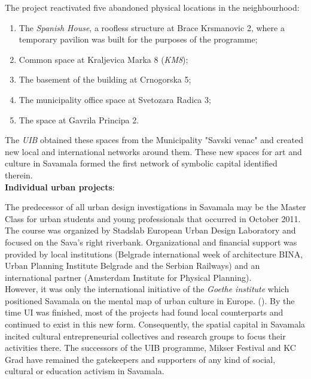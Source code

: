 \documentclass[11pt]{report}
\begin{document}
The project reactivated five abandoned physical locations in the neighbourhood:

\begin{enumerate}
\item The \textit{Spanish House}, a roofless structure at Brace Krsmanovic 2, where a temporary pavilion was built for the purposes of the programme;

\item Common space at Kraljevica Marka 8 (\textit{KM8});

\item The basement of the building at Crnogorska 5;

\item The municipality office space at Svetozara Radica 3;

\item The space at Gavrila Principa 2.
\end{enumerate}

The \textit{UIB} obtained these spaces from the Municipality "Savski venac" and created new local and international networks around them.
These new spaces for art and culture in Savamala formed the first network of symbolic capital identified therein.
\\
\textbf{Individual urban projects}:

The predecessor of all urban design investigations in Savamala may be the Master Class for urban students and young professionals that occurred in October 2011. The course was organized by Stadslab European Urban Design Laboratory and focused on the Sava’s right riverbank. Organizational and financial support was provided by local institutions (Belgrade international week of architecture BINA, Urban Planning Institute Belgrade and the Serbian Railways) and an international partner (Amsterdam Institute for Physical Planning).
\\

However, it was only the international initiative of the \textit{Goethe institute} which positioned Savamala on the mental map of urban culture in Europe. (\href{Kamenzid}{\citealt{kamenzid_urban_2013}}).
By the time UI was finished, most of the projects had found local counterparts and continued to exist in this new form. Consequently, the spatial capital in Savamala incited cultural entrepreneurial collectives and research groups to focus their activities there. The successors of the UIB programme, Mikser Festival and KC Grad have remained the gatekeepers and supporters of any kind of social, cultural or education activism in Savamala.
\\
\end{document}
